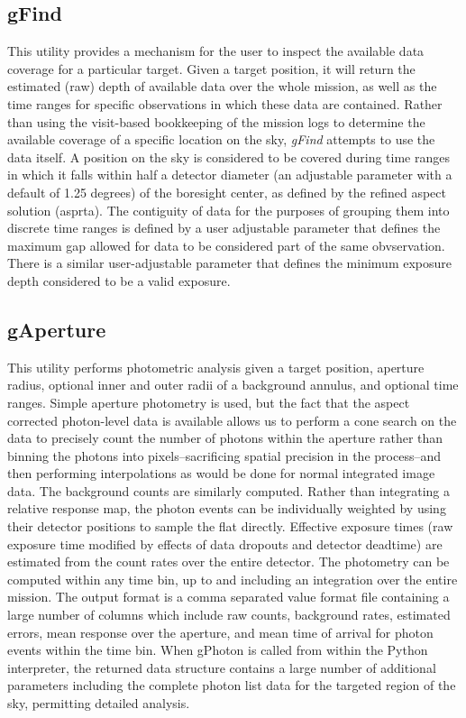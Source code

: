 \documentclass[preprint]{aastex}
\begin{document}
\subsection{gFind}
This utility provides a mechanism for the user to inspect the available data coverage for a particular target. Given a target position, it will return the estimated (raw) depth of available data over the whole mission, as well as the time ranges for specific observations in which these data are contained. Rather than using the visit-based bookkeeping of the mission logs to determine the available coverage of a specific location on the sky, \textit{gFind} attempts to use the data itself. A position on the sky is considered to be covered during time ranges in which it falls within half a detector diameter (an adjustable parameter with a default of 1.25 degrees) of the boresight center, as defined by the refined aspect solution (asprta). The contiguity of data for the purposes of grouping them into discrete time ranges is defined by a user adjustable parameter that defines the maximum gap allowed for data to be considered part of the same obvservation. There is a similar user-adjustable parameter that defines the minimum exposure depth considered to be a valid exposure.

\subsection{gAperture}
This utility performs photometric analysis given a target position, aperture radius, optional inner and outer radii of a background annulus, and optional time ranges. Simple aperture photometry is used, but the fact that the aspect corrected photon-level data is available allows us to perform a cone search on the data to precisely count the number of photons within the aperture rather than binning the photons into pixels--sacrificing spatial precision in the process--and then performing interpolations as would be done for normal integrated image data. The background counts are similarly computed. Rather than integrating a relative response map, the photon events can be individually weighted by using their detector positions to sample the flat directly. Effective exposure times (raw exposure time modified by effects of data dropouts and detector deadtime) are estimated from the count rates over the entire detector. The photometry can be computed within any time bin, up to and including an integration over the entire mission. The output format is a comma separated value format file containing a large number of columns which include raw counts, background rates, estimated errors, mean response over the aperture, and mean time of arrival for photon events within the time bin. When gPhoton is called from within the Python interpreter, the returned data structure contains a large number of additional parameters including the complete photon list data for the targeted region of the sky, permitting detailed analysis.
\end{document}

